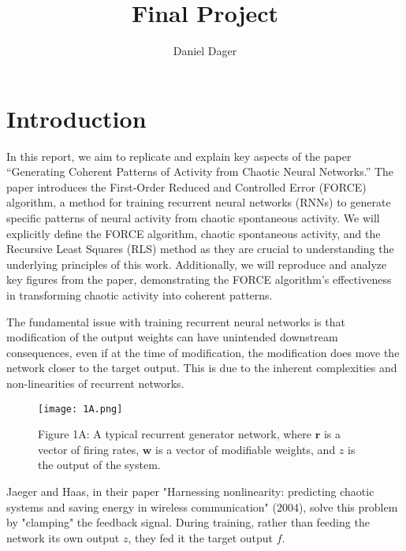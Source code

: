 \documentclass{article}
\makeatletter
\renewcommand{\maketitle}{
    {\raggedleft  %
    \vspace*{-10pt}  %
    {\large\@title \par}  %
    \vspace{5pt}  %
    {\normalsize\@author \par}
    \vspace{5pt}  %
    {\normalsize\@date \par}
    \vspace{20pt}}  %
}
\makeatother
\begin{document}
\title{Final Project}
\author{Daniel Dager}
\date{}
\maketitle

\pagestyle{empty} %
\thispagestyle{empty}

\renewcommand{\thesection}{1.\arabic{section}}

\section*{Introduction}
\vspace{.5em}

In this report, we aim to replicate and explain key aspects of the paper “Generating Coherent Patterns of Activity from Chaotic Neural Networks.” The paper introduces the First-Order Reduced and Controlled Error (FORCE) algorithm, a method for training recurrent neural networks (RNNs) to generate specific patterns of neural activity from chaotic spontaneous activity. We will explicitly define the FORCE algorithm, chaotic spontaneous activity, and the Recursive Least Squares (RLS) method as they are crucial to understanding the underlying principles of this work. Additionally, we will reproduce and analyze key figures from the paper, demonstrating the FORCE algorithm’s effectiveness in transforming chaotic activity into coherent patterns.
\vspace{1em}

The fundamental issue with training recurrent neural networks is that modification of the output weights can have unintended downstream consequences, even if at the time of modification, the modification does move the network closer to the target output. This is due to the inherent complexities and non-linearities of recurrent networks.

\begin{figure}[ht]
    \centering
    \texttt{[image: 1A.png]}
    \captionsetup{font=normalsize, width=1\textwidth, labelformat=empty}
    \caption{Figure 1A: A typical recurrent generator network, where $\boldsymbol{r}$ is a vector of firing rates, $\boldsymbol{w}$ is a vector of modifiable weights, and $z$ is the output of the system.}
\end{figure}

Jaeger and Haas, in their paper "Harnessing nonlinearity: predicting chaotic systems and saving energy in wireless communication" (2004), solve this problem by "clamping" the feedback signal. During training, rather than feeding the network its own output $z$, they fed it the target output $f$.
\vspace{1em}
\end{document}
